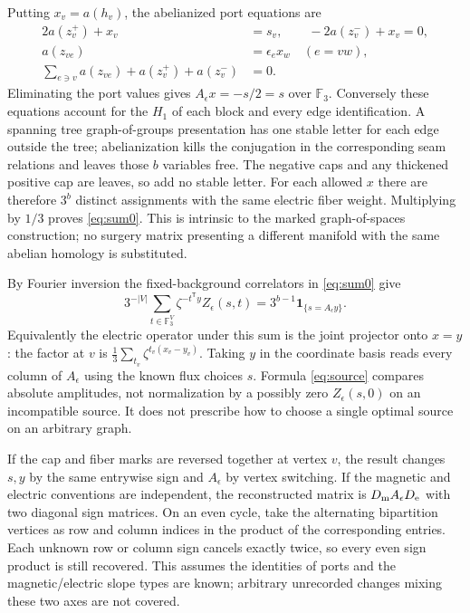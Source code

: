 \documentclass[11pt]{article}
\newcommand{\F}{\mathbb F_3}
\begin{document}
Putting \(x_v=a(h_v)\), the abelianized port equations are
\begin{align*}
 2a(z_v^+)+x_v&=s_v,\qquad -2a(z_v^-)+x_v=0,\\
 a(z_{ve})&=\epsilon_e x_w \quad (e=vw),\\
 \sum_{e\ni v}a(z_{ve})+a(z_v^+)+a(z_v^-)&=0.
\end{align*}
Eliminating the port values gives \(A_\epsilon x=-s/2=s\) over \(\F\). Conversely these equations account for the \(H_1\) of each block and every edge identification. A spanning tree graph-of-groups presentation has one stable letter for each edge outside the tree; abelianization kills the conjugation in the corresponding seam relations and leaves those \(b\) variables free. The negative caps and any thickened positive cap are leaves, so add no stable letter. For each allowed \(x\) there are therefore \(3^b\) distinct assignments with the same electric fiber weight. Multiplying by \(1/3\) proves \eqref{eq:sum0}. This is intrinsic to the marked graph-of-spaces construction; no surgery matrix presenting a different manifold with the same abelian homology is substituted.

By Fourier inversion the fixed-background correlators in \eqref{eq:sum0} give
\begin{equation}
 3^{-|V|}\sum_{t\in\F^V}
    \zeta^{-t^{\mathsf T}y} Z_\epsilon(s,t)
 =3^{b-1}\mathbf1_{\{s=A_\epsilon y\}} .
 \label{eq:source}
\end{equation}
Equivalently the electric operator under this sum is the joint projector onto \(x=y\): the factor at \(v\) is \(\frac13\sum_{t_v}\zeta^{t_v(x_v-y_v)}\). Taking \(y\) in the coordinate basis reads every column of \(A_\epsilon\) using the known flux choices \(s\). Formula \eqref{eq:source} compares absolute amplitudes, not normalization by a possibly zero \(Z_\epsilon(s,0)\) on an incompatible source. It does not prescribe how to choose a single optimal source on an arbitrary graph.

If the cap and fiber marks are reversed together at vertex \(v\), the result changes \(s,y\) by the same entrywise sign and \(A_\epsilon\) by vertex switching. If the magnetic and electric conventions are independent, the reconstructed matrix is \(D_{\rm m}A_\epsilon D_{\rm e}\) with two diagonal sign matrices. On an even cycle, take the alternating bipartition vertices as row and column indices in the product of the corresponding entries. Each unknown row or column sign cancels exactly twice, so every even sign product is still recovered. This assumes the identities of ports and the magnetic/electric slope types are known; arbitrary unrecorded changes mixing these two axes are not covered.
\end{document}
